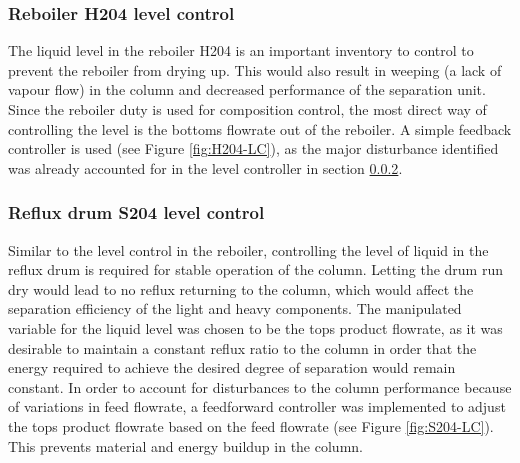 \subsubsection{Reboiler H204 level control} %
The liquid level in the reboiler H204 is an important inventory to control to prevent the reboiler from drying up. This would also result in weeping (a lack of vapour flow) in the column and decreased performance of the separation unit. Since the reboiler duty is used for composition control, the most direct way of controlling the level is the bottoms flowrate out of the reboiler. A simple feedback controller is used (see Figure \ref{fig:H204-LC}), as the major disturbance identified was already accounted for in the level controller in section \ref{sec:S204-LC}. 

\subsubsection{Reflux drum S204 level control}%
\label{sec:S204-LC}
Similar to the level control in the reboiler, controlling the level of liquid in the reflux drum is required for stable operation of the column. Letting the drum run dry would lead to no reflux returning to the column, which would affect the separation efficiency of the light and heavy components. The manipulated variable for the liquid level was chosen to be the tops product flowrate, as it was desirable to maintain a constant reflux ratio to the column in order that the energy required to achieve the desired degree of separation would remain constant. In order to account for disturbances to the column performance because of variations in feed flowrate, a feedforward controller was implemented to adjust the tops product flowrate based on the feed flowrate (see Figure \ref{fig:S204-LC}). This prevents material and energy buildup in the column. 

